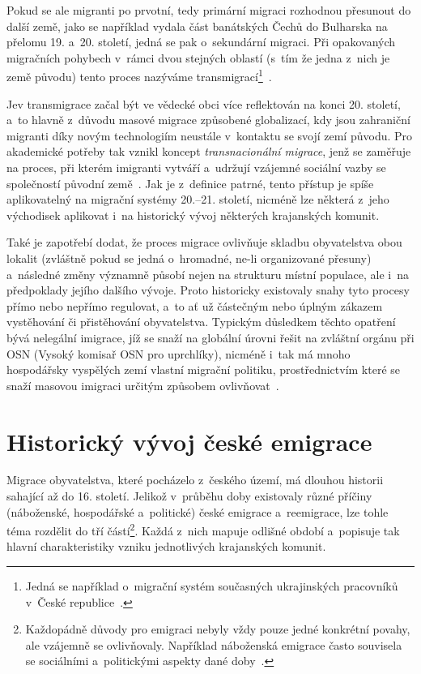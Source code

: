Pokud se ale migranti po prvotní, tedy primární migraci rozhodnou přesunout do další země, jako se například vydala část banátských Čechů do Bulharska na přelomu 19. a~20. století, jedná se pak o~sekundární migraci. Při opakovaných migračních pohybech v~rámci dvou stejných oblastí (s~tím že jedna z~nich je země původu) tento proces nazýváme transmigrací\footnote{Jedná se například o~migrační systém současných ukrajinských pracovníků v~České republice~\parencite{Nespor2005}.}~\parencite{Nespor2005}.

Jev transmigrace začal být ve vědecké obci více reflektován na konci 20. století, a~to hlavně z~důvodu masové migrace způsobené globalizací, kdy jsou zahraniční migranti díky novým technologiím neustále v~kontaktu se svojí zemí původu. Pro akademické potřeby tak vznikl koncept \emph{transnacionální migrace}, jenž se zaměřuje na proces, při kterém imigranti vytváří a~udržují vzájemné sociální vazby se společností původní země~\parencite{Kralova2013}. Jak je z~definice patrné, tento přístup je spíše aplikovatelný na migrační systémy 20.--21. století, nicméně lze některá z~jeho východisek aplikovat i~na historický vývoj některých krajanských komunit.

Také je zapotřebí dodat, že proces migrace ovlivňuje skladbu obyvatelstva obou lokalit (zvláštně pokud se jedná o~hromadné, ne-li organizované přesuny) a~následné změny významně působí nejen na strukturu místní populace, ale i~na předpoklady jejího dalšího vývoje. Proto historicky existovaly snahy tyto procesy přímo nebo nepřímo regulovat, a~to ať už částečným nebo úplným zákazem vystěhování či přistěhování obyvatelstva. Typickým důsledkem těchto opatření bývá nelegální imigrace, jíž se snaží na globální úrovni řešit na zvláštní orgánu při OSN (Vysoký komisař OSN pro uprchlíky), nicméně i~tak má mnoho hospodářsky vyspělých zemí vlastní migrační politiku, prostřednictvím které se snaží masovou imigraci určitým způsobem ovlivňovat~\parencite{Fialova2017a}.

\hypertarget{historickuxfd-vuxfdvoj-ux10deskuxe9-emigrace}{%
\section{Historický vývoj české emigrace}\label{historickuxfd-vuxfdvoj-ux10deskuxe9-emigrace}}

Migrace obyvatelstva, které pocházelo z~českého území, má dlouhou historii sahající až do 16. století. Jelikož v~průběhu doby existovaly různé příčiny (náboženské, hospodářské a~politické) české emigrace a~reemigrace, lze tohle téma rozdělit do tří částí\footnote{Každopádně důvody pro emigraci nebyly vždy pouze jedné konkrétní povahy, ale vzájemně se ovlivňovaly. Například náboženská emigrace často souvisela se sociálními a~politickými aspekty dané doby~\parencite{Vaculik2009a}.}. Každá z~nich mapuje odlišné období a~popisuje tak hlavní charakteristiky vzniku jednotlivých krajanských komunit.

